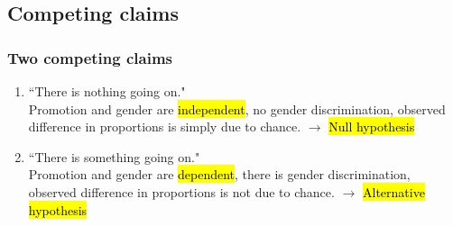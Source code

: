 
\subsection{Competing claims}


\begin{frame}
\frametitle{Two competing claims}

\begin{enumerate}

\item ``There is nothing going on." \\
Promotion and gender are \hl{independent}, no gender discrimination, observed difference in proportions is simply due to chance. $\rightarrow$ \hl{Null hypothesis}

\pause

\item ``There is something going on." \\
Promotion and gender are \hl{dependent}, there is gender discrimination, observed difference in proportions is not due to chance. $\rightarrow$ \hl{Alternative hypothesis}

\end{enumerate}

\end{frame}


